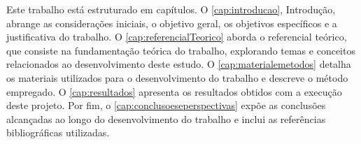 Este trabalho está estruturado em capítulos. O \autoref{cap:introducao}, Introdução, abrange as considerações iniciais, o objetivo geral, os objetivos específicos e a justificativa do trabalho. O \autoref{cap:referencialTeorico} aborda o referencial teórico, que consiste na fundamentação teórica do trabalho, explorando temas e conceitos relacionados ao desenvolvimento deste estudo. O \autoref{cap:materialemetodos} detalha os materiais utilizados para o desenvolvimento do trabalho e descreve o método empregado. O \autoref{cap:resultados} apresenta os resultados obtidos com a execução deste projeto. Por fim, o \autoref{cap:conclusoeseperspectivas} expõe as conclusões alcançadas ao longo do desenvolvimento do trabalho e inclui as referências bibliográficas utilizadas.
